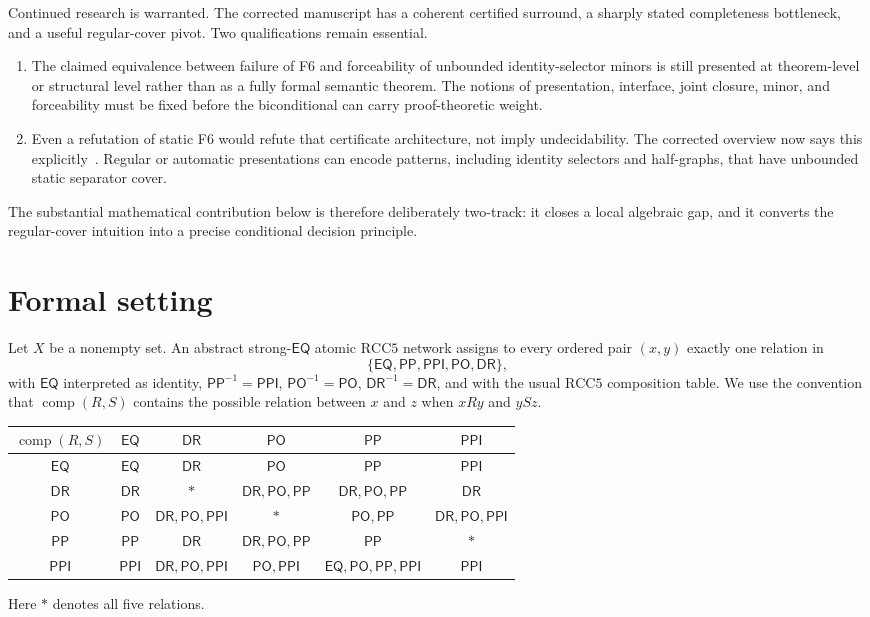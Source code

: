 \documentclass[11pt]{article}
\theoremstyle{definition}
\theoremstyle{remark}
\newcommand{\RCC}{\mathrm{RCC5}}
\newcommand{\EQ}{\mathsf{EQ}}
\newcommand{\PP}{\mathsf{PP}}
\newcommand{\PPI}{\mathsf{PPI}}
\newcommand{\PO}{\mathsf{PO}}
\newcommand{\DR}{\mathsf{DR}}
\begin{document}
Continued research is warranted.  The corrected manuscript has a coherent certified surround, a sharply stated completeness bottleneck, and a useful regular-cover pivot.  Two qualifications remain essential.

\begin{enumerate}[label=(\roman*),leftmargin=2.2em]
\item The claimed equivalence between failure of F6 and forceability of unbounded identity-selector minors is still presented at theorem-level or structural level rather than as a fully formal semantic theorem.  The notions of presentation, interface, joint closure, minor, and forceability must be fixed before the biconditional can carry proof-theoretic weight.
\item Even a refutation of static F6 would refute that certificate architecture, not imply undecidability.  The corrected overview now says this explicitly~\cite[Sec.~10]{WesselOverviewCorrected}.  Regular or automatic presentations can encode patterns, including identity selectors and half-graphs, that have unbounded static separator cover.
\end{enumerate}

The substantial mathematical contribution below is therefore deliberately two-track: it closes a local algebraic gap, and it converts the regular-cover intuition into a precise conditional decision principle.

\section{Formal setting}

Let $X$ be a nonempty set.  An abstract strong-$\EQ$ atomic $\RCC$ network assigns to every ordered pair $(x,y)$ exactly one relation in
\[
  \{\EQ,\PP,\PPI,\PO,\DR\},
\]
with $\EQ$ interpreted as identity, $\PP^{-1}=\PPI$, $\PO^{-1}=\PO$, $\DR^{-1}=\DR$, and with the usual $\RCC$ composition table.  We use the convention that $\operatorname{comp}(R,S)$ contains the possible relation between $x$ and $z$ when $xRy$ and $ySz$.

\begin{center}
\small
\begin{tabular}{c|ccccc}
\toprule
$\operatorname{comp}(R,S)$ & $\EQ$ & $\DR$ & $\PO$ & $\PP$ & $\PPI$\\
\midrule
$\EQ$  & $\EQ$ & $\DR$ & $\PO$ & $\PP$ & $\PPI$\\
$\DR$  & $\DR$ & $*$ & $\DR,\PO,\PP$ & $\DR,\PO,\PP$ & $\DR$\\
$\PO$  & $\PO$ & $\DR,\PO,\PPI$ & $*$ & $\PO,\PP$ & $\DR,\PO,\PPI$\\
$\PP$  & $\PP$ & $\DR$ & $\DR,\PO,\PP$ & $\PP$ & $*$\\
$\PPI$ & $\PPI$ & $\DR,\PO,\PPI$ & $\PO,\PPI$ & $\EQ,\PO,\PP,\PPI$ & $\PPI$\\
\bottomrule
\end{tabular}
\end{center}
Here $*$ denotes all five relations.
\end{document}

